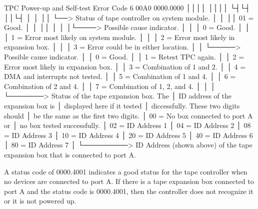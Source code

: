 \begin{ttfig}{TPC Power-up and Self-test Error Code}
6  00A0 0000.0000
        ││││ ││││
        └┤└┤ ││└┤
         │ │ ││ └──> Status of tape controller on system module.
         │ │ ││       01 = Good.
         │ │ ││
         │ │ │└────> Possible cause indicator.
         │ │ │        0 = Good.
         │ │ │        1 = Error most likely on system module.
         │ │ │        2 = Error most likely in expansion box.
         │ │ │        3 = Error could be in either location.
         │ │ └─────> Possible cause indicator.
         │ │          0 = Good.
         │ │          1 = Retest TPC again.
         │ │          2 = Error most likely in expansion box.
         │ │          3 = Combination of 1 and 2.
         │ │          4 = DMA and interrupts not tested.
         │ │          5 = Combination of 1 and 4.
         │ │          6 = Combination of 2 and 4.
         │ │          7 = Combination of 1, 2, and 4.
         │ │          
         │ └───────> Status of the tape expansion box. The
         │           ID address of the expansion box is
         │           displayed here if it tested
         │           diccessfully. These two digits should
         │           be the same as the first two digits.
         │            00 = No box connected to port A or
         │                 no box tested successfully.
         │            02 = ID Address 1
         │            04 = ID Address 2
         │            08 = ID Address 3
         │            10 = ID Address 4
         │            20 = ID Address 5
         │            40 = ID Address 6
         │            80 = ID Address 7
         │
         └─────────> ID Address (shown above) of the tape
                     expansion box that is connected to
                     port A.
\end{ttfig}

A status code of 0000.4001 indicates a good status for the tape controller
when no devices are connected to port A. If there is a tape expansion box
connected to port A and the status code is 0000.4001, then the controller
does not recognize it or it is not powered up.

